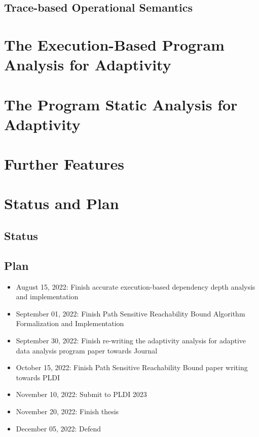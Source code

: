 \documentclass[a4paper,11pt]{article}
\begin{document}


\subsection{Trace-based Operational Semantics}
\label{sec:language-os}

% 
\cleardoublepage

\section{The Execution-Based Program Analysis for Adaptivity}
\label{sec:dynamic}


\section{The Program Static Analysis for Adaptivity}
\label{sec:static}

\cleardoublepage


\section{Further Features}
\label{sec:furthers}


% 

% 

\section{Status and Plan}

\subsection{Status}


\subsection{Plan}
\begin{itemize}
\item August 15, 2022: Finish accurate execution-based dependency depth analysis and implementation
\item September 01, 2022: Finish Path Sensitive Reachability Bound Algorithm Formalization and Implementation
\item September 30, 2022: Finish re-writing the adaptivity analysis for adaptive data analysis program paper towards Journal
\item October 15, 2022: Finish Path Sensitive Reachability Bound paper writing towards PLDI
\item November 10, 2022: Submit to PLDI 2023
\item November 20, 2022: Finish thesis
\item December 05, 2022: Defend
\end{itemize}




\end{document}
